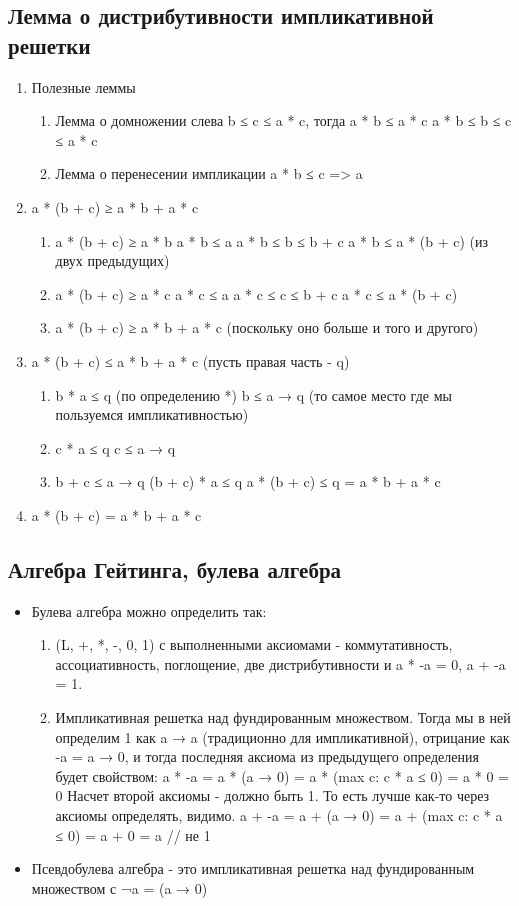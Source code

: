 \documentclass[11pt]{article}
\begin{document}
\subsection{Лемма о дистрибутивности импликативной решетки}
\label{sec-5-4}
\begin{enumerate}
\item Полезные леммы
\begin{enumerate}
\item Лемма о домножении слева
b ≤ c ≤ a * c, тогда a * b ≤ a * c
a * b ≤ b ≤ c ≤ a * c
\item Лемма о перенесении импликации
a * b ≤ c => a
\end{enumerate}
\item a * (b + c) ≥ a * b + a * c
\begin{enumerate}
\item a * (b + c) ≥ a * b
a * b ≤ a
a * b ≤ b ≤ b + c
a * b ≤ a * (b + c)  (из двух предыдущих)
\item a * (b + c) ≥ a * c
a * c ≤ a
a * c ≤ c ≤ b + c
a * c ≤ a * (b + c)
\item a * (b + c) ≥ a * b + a * c (поскольку оно больше и того и другого)
\end{enumerate}
\item a * (b + c) ≤ a * b + a * c (пусть правая часть - q)
\begin{enumerate}
\item b * a ≤ q (по определению *)
b ≤ a → q (то самое место где мы пользуемся импликативностью)
\item c * a ≤ q
c ≤ a → q
\item b + c ≤ a → q
(b + c) * a ≤ q
a * (b + c) ≤ q = a * b + a * c
\end{enumerate}
\item a * (b + c) = a * b + a * c
\end{enumerate}
\subsection{Алгебра Гейтинга, булева алгебра}
\label{sec-5-5}
\begin{itemize}
\item Булева алгебра можно определить так:
\begin{enumerate}
\item (L, +, *, -, 0, 1) с выполненными аксиомами - коммутативность,
ассоциативность, поглощение, две дистрибутивности и a * -a = 0,
a + -a = 1.
\item Импликативная решетка над фундированным множеством.
Тогда мы в ней определим 1 как a → a (традиционно для импликативной),
отрицание как -a = a → 0, и тогда последняя аксиома из
предыдущего определения будет свойством:
a * -a = a * (a → 0) = a * (max c: c * a ≤ 0) = a * 0 = 0
Насчет второй аксиомы - должно быть 1. То есть лучше как-то
через аксиомы определять, видимо.
a + -a = a + (a → 0) = a + (max c: c * a ≤ 0) = a + 0 = a // не 1
\end{enumerate}
\item Псевдобулева алгебра - это импликативная решетка над фундированным
множеством с ¬a = (a → 0)
\end{itemize}
\end{document}
